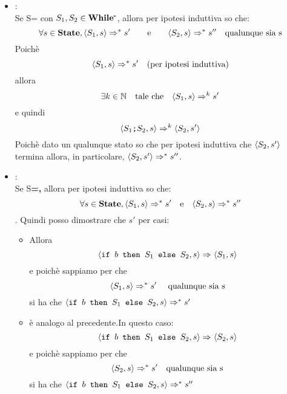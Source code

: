 {\begin{itemize}
	\item {}:	
	\casespace{}
	\\
	
	Se S=	con $S_1,S_2\in\whilem$, allora per ipotesi induttiva so che: 
	\[ \forall{}s\in\states, \confSs{S_1}{s}\Rar{*}s' \qquad  \textrm{e} \qquad  
	\confSs{S_2}{s}\Rar{*}s''\quad \textrm{qualunque sia s} \]
	Poichè 
	\[ \confSs{S_1}{s}\Rar{*}s' \quad \textrm{(per ipotesi induttiva)} \] allora 
	\[ \exists{}k\in\mathbb{N}  \quad \textrm{tale che}  \quad \confSs{S_1}{s}\Rar{k}s'\] e quindi
\[ 	\confSs{\concat{$S_1$}{$S_2$}}{s}\Rar{k}\confSs{S_2}{s'} \] 
    Poichè	dato un qualunque stato so che per ipotesi induttiva che  $ \confSs{S_2}{s'} $ 
	termina allora, in particolare, $\confSs{S_2}{s'}\Rar{*}s''$.

	\item {}: 	
	\casespace{}
	\\
	
	Se S\textbf{=,} allora per ipotesi induttiva so che: 
	\[ \forall{}s\in\states, \confSs{S_1}{s}\Rar{*}s' \quad \textrm{e} \quad 
	\confSs{S_2}{s}\Rar{*}s'' \]. Quindi posso dimostrare che 
	\Rar{*}$s'$ per casi:
	\begin{itemize}
	\item {} Allora 
	\[ \confSs{\ifABC{b}{S_1}{S_2}}{s}\Rar{}\confSs{{S_1}}{s} \] e poichè sappiamo per \hi{} che \[ \confSs{S_1}{s}\Rar{*}s' \quad  \textrm{ qualunque sia s} \] si ha
	che $\confSs{\ifABC{b}{S_1}{S_2}}{s}\Rar{*}s'$
    \postcasespace
	\item {} è analogo al precedente.In questo caso: 
	\[ \confSs{\ifABC{b}{S_1}{S_2}}{s}\Rar{}\confSs{{S_2}}{s}  \]e poichè sappiamo
	per \hi{} che \[ \confSs{S_2}{s}\Rar{*}s' \quad \textrm{qualunque sia s} \] si ha
	che $\confSs{\ifABC{b}{S_1}{S_2}}{s}\Rar{*}s''$
	\end{itemize}

	\end{itemize}
}
\newpage